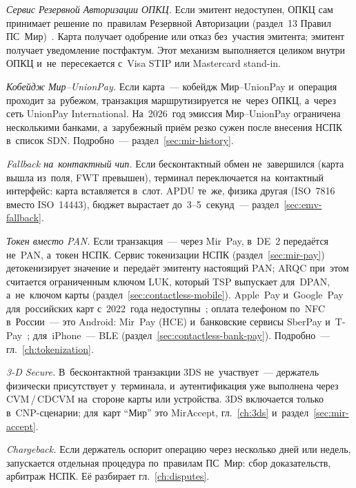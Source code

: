 \emph{Сервис Резервной Авторизации ОПКЦ.} Если эмитент недоступен, ОПКЦ сам
принимает решение по~правилам Резервной Авторизации (раздел~13 Правил
ПС~Мир)~\cite{nspk-mir-rules-v43}. Карта получает одобрение или отказ
без~участия эмитента; эмитент получает уведомление постфактум. Этот
механизм выполняется целиком внутри ОПКЦ и~не~пересекается с~Visa STIP или
Mastercard stand-in.

\emph{Кобейдж Мир--UnionPay.} Если карта~--- кобейдж Мир--UnionPay
и~операция проходит за~рубежом, транзакция маршрутизируется не~через ОПКЦ,
а~через сеть UnionPay International. На~2026~год эмиссия Мир--UnionPay
ограничена несколькими банками, а~зарубежный приём резко сужен после внесения НСПК
в~список SDN. Подробно~---
раздел~\ref{sec:mir-history}.

\emph{Fallback на~контактный чип.} Если бесконтактный обмен не~завершился
(карта вышла из~поля, FWT превышен), терминал переключается на~контактный
интерфейс: карта вставляется в~слот. APDU те~же, физика другая
(ISO~7816 вместо ISO~14443), бюджет вырастает до~3--5~секунд~---
раздел~\ref{sec:emv-fallback}.

\emph{Токен вместо PAN.} Если транзакция~--- через Mir~Pay, в~DE~2 передаётся
не~PAN, а~токен НСПК. Сервис токенизации НСПК (раздел~\ref{sec:mir-pay})
детокенизирует значение и~передаёт эмитенту настоящий PAN;
ARQC при~этом считается ограниченным ключом LUK, который TSP выпускает для~DPAN,
а~не~ключом карты (раздел~\ref{sec:contactless-mobile}). Apple~Pay и~Google~Pay
для~российских карт с~2022~года недоступны~\cite{nfcw-applepay-googlepay-mir-2022};
оплата телефоном по~NFC в~России~--- это Android: Mir~Pay (HCE)
и~банковские сервисы SberPay и~T-Pay~\cite{habr-sberpay-nfc-2022,tbank-tpay-nfc};
для~iPhone~--- BLE (раздел~\ref{sec:contactless-bank-pay}). Подробно~---
гл.~\ref{ch:tokenization}.

\emph{3-D Secure.} В~бесконтактной транзакции 3DS не~участвует~--- держатель
физически присутствует у~терминала, и~аутентификация уже выполнена через
CVM\,/\,CDCVM на~стороне карты или устройства. 3DS включается только в~CNP-сценарии;
для~карт \enquote{Мир} это MirAccept, гл.~\ref{ch:3ds} и~раздел~\ref{sec:mir-accept}.

\emph{Chargeback.} Если держатель оспорит операцию через несколько дней или
недель, запускается отдельная процедура по~правилам ПС~Мир: сбор доказательств,
арбитраж НСПК. Её разбирает гл.~\ref{ch:disputes}.
